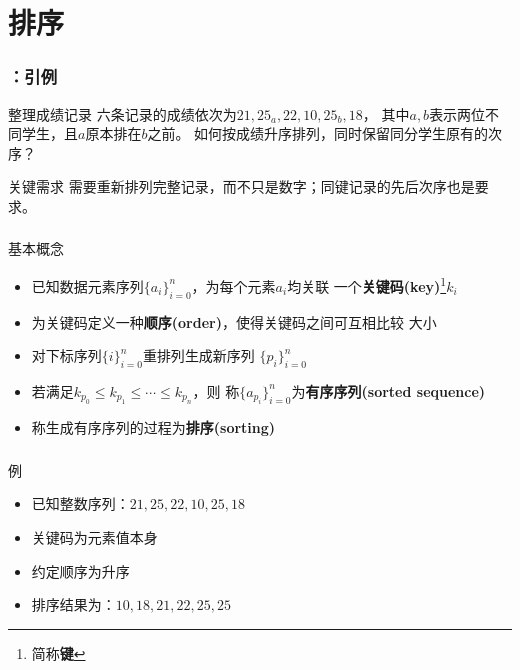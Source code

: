 \section{排序}

\begin{frame}
    \frametitle{\insertsectionhead：引例}
    \begin{exampleblock}{整理成绩记录}
        六条记录的成绩依次为$21,25_a,22,10,25_b,18$，
        其中$a,b$表示两位不同学生，且$a$原本排在$b$之前。
        如何按成绩升序排列，同时保留同分学生原有的次序？
    \end{exampleblock}
    \begin{block}{关键需求}
        需要重新排列完整记录，而不只是数字；同键记录的先后次序也是要求。
    \end{block}
\end{frame}

\begin{frame}
    \frametitle{\insertsectionhead}
    \begin{block}{基本概念}
        \begin{itemize}
            \item 已知数据元素序列$\{a_{i}\}_{i=0}^{n}$，为每个元素$a_{i}$均关联
                  一个\textbf{关键码(key)}\footnote{简称\textbf{键}}$k_{i}$
            \item 为关键码定义一种\textbf{顺序(order)}，使得关键码之间可互相比较
                  大小
            \item 对下标序列$\{i\}_{i=0}^{n}$重\alert{排列}生成新序列
                  $\{p_{i}\}_{i=0}^{n}$
            \item 若满足$k_{p_{0}}\leq{}k_{p_{1}}\leq\cdots\leq{}k_{p_{n}}$，则
                  称$\{a_{p_{i}}\}_{i=0}^{n}$为\textbf{有序序列(sorted
                      sequence)}
            \item 称生成有序序列的过程为\textbf{排序(sorting)}
        \end{itemize}
    \end{block}
\end{frame}

\begin{frame}
    \frametitle{\insertsectionhead}
    \begin{exampleblock}{例}
        \begin{itemize}
            \item 已知整数序列：$21, 25, 22, 10, 25, 18$
            \item \alert{关键码}为元素值本身
            \item 约定\alert{顺序}为升序
            \item 排序结果为：$10, 18, 21, 22, 25, 25$
        \end{itemize}
    \end{exampleblock}
\end{frame}

